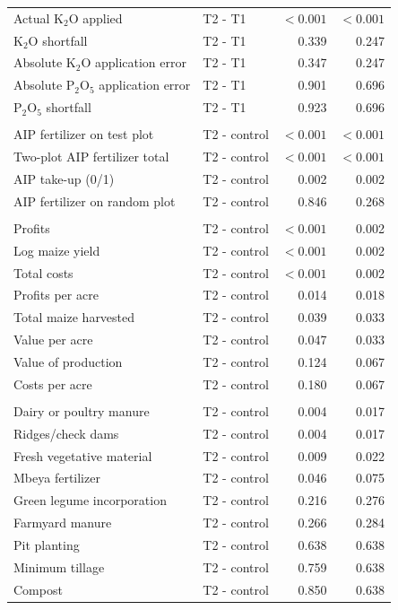 \begin{tabularx}{\linewidth}{Xlrr}
Actual K$_2$O applied & T2 - T1 & $<0.001$ & $<0.001$ \\
K$_2$O shortfall & T2 - T1 & 0.339 & 0.247 \\
Absolute K$_2$O application error & T2 - T1 & 0.347 & 0.247 \\
Absolute P$_2$O$_5$ application error & T2 - T1 & 0.901 & 0.696 \\
P$_2$O$_5$ shortfall & T2 - T1 & 0.923 & 0.696 \\
\addlinespace
\multicolumn{4}{l}{\textit{AIP substitution}} \\
AIP fertilizer on test plot & T2 - control & $<0.001$ & $<0.001$ \\
Two-plot AIP fertilizer total & T2 - control & $<0.001$ & $<0.001$ \\
AIP take-up (0/1) & T2 - control & 0.002 & 0.002 \\
AIP fertilizer on random plot & T2 - control & 0.846 & 0.268 \\
\addlinespace
\multicolumn{4}{l}{\textit{Production and economic outcomes}} \\
Profits & T2 - control & $<0.001$ & 0.002 \\
Log maize yield & T2 - control & $<0.001$ & 0.002 \\
Total costs & T2 - control & $<0.001$ & 0.002 \\
Profits per acre & T2 - control & 0.014 & 0.018 \\
Total maize harvested & T2 - control & 0.039 & 0.033 \\
Value per acre & T2 - control & 0.047 & 0.033 \\
Value of production & T2 - control & 0.124 & 0.067 \\
Costs per acre & T2 - control & 0.180 & 0.067 \\
\addlinespace
\multicolumn{4}{l}{\textit{Secondary SNM practices}} \\
Dairy or poultry manure & T2 - control & 0.004 & 0.017 \\
Ridges/check dams & T2 - control & 0.004 & 0.017 \\
Fresh vegetative material & T2 - control & 0.009 & 0.022 \\
Mbeya fertilizer & T2 - control & 0.046 & 0.075 \\
Green legume incorporation & T2 - control & 0.216 & 0.276 \\
Farmyard manure & T2 - control & 0.266 & 0.284 \\
Pit planting & T2 - control & 0.638 & 0.638 \\
Minimum tillage & T2 - control & 0.759 & 0.638 \\
Compost & T2 - control & 0.850 & 0.638 \\
\hline\hline
\end{tabularx}

